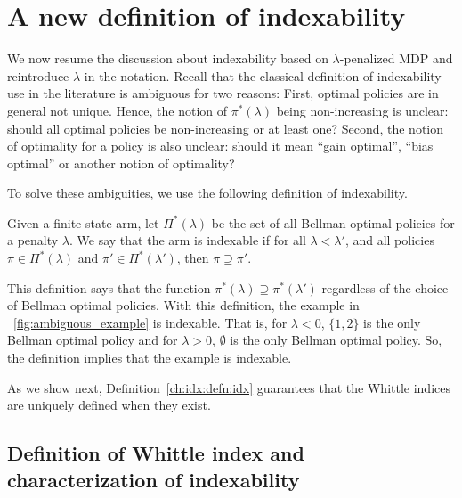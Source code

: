 \section{A new definition of indexability}
\label{ch:idx:sec:idx}

We now resume the discussion about indexability based on $\lambda$-penalized MDP and reintroduce $\lambda$ in the notation.
Recall that the classical definition of indexability use in the literature is ambiguous for two reasons: First, optimal policies are in general not unique. Hence, the notion of $\pi^*(\lambda)$ being non-increasing is unclear: should all optimal policies be non-increasing or at least one? Second, the notion of optimality for a policy is also unclear: should it mean ``gain optimal'', ``bias optimal'' or another notion of optimality? 

To solve these ambiguities, we use the following definition of indexability.  
\begin{defn}
    Given a finite-state arm, let $\Pi^*(\lambda)$ be the set of all Bellman optimal policies for a penalty $\lambda$.
    We say that the arm is indexable if for all $\lambda<\lambda'$, and all policies $\pi\in\Pi^*(\lambda)$ and $\pi'\in\Pi^*(\lambda')$, then $\pi\supseteq\pi'$.
    \label{ch:idx:defn:idx}
\end{defn}
This definition says that the function $\pi^*(\lambda)\supseteq\pi^*(\lambda')$ regardless of the choice of Bellman optimal policies.
With this definition, the example in \figurename~\ref{fig:ambiguous_example} is indexable.
That is, for $\lambda<0$, $\{1,2\}$ is the only Bellman optimal policy and for $\lambda>0$, $\emptyset$ is the only Bellman optimal policy.
So, the definition implies that the example is indexable.

As we show next, Definition~\ref{ch:idx:defn:idx} guarantees that the Whittle indices are uniquely defined when they exist.

\subsection{Definition of Whittle index and characterization of indexability}

